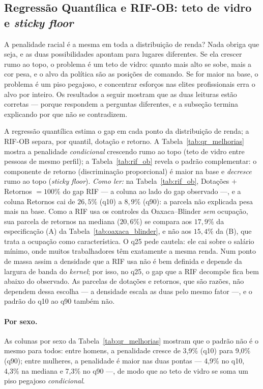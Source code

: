 \documentclass[12pt, a4paper, oneside]{article}
\let\oldsubsectionFB\subsection
\renewcommand{\subsection}{\FloatBarrier\oldsubsectionFB}
\begin{document}
\subsection{Regressão Quantílica e RIF-OB: teto de vidro e \emph{sticky floor}}
\label{subsec:qr_rif}
A penalidade racial é a mesma em toda a distribuição de renda? Nada obriga que seja,
e as duas possibilidades apontam para lugares diferentes. Se ela crescer rumo ao topo, o
problema é um teto de vidro: quanto mais alto se sobe, mais a cor pesa, e o alvo da
política são as posições de comando. Se for maior na base, o problema é um piso
pegajoso, e concentrar esforços nas elites profissionais erra o alvo por inteiro. Os
resultados a seguir mostram que as duas leituras estão corretas --- porque respondem a
perguntas diferentes, e a subseção termina explicando por que não se contradizem.

A regressão quantílica estima o gap em cada ponto da distribuição de renda; a
RIF-OB separa, por quantil, dotação e retorno. A Tabela~\ref{tab:qr_melhorias}
mostra a penalidade \emph{condicional} crescendo rumo ao topo (teto de vidro entre
pessoas de mesmo perfil); a
Tabela~\ref{tab:rif_ob} revela o padrão complementar: o componente de retorno
(discriminação proporcional) é maior na base e \emph{decresce} rumo ao topo
(\emph{sticky floor}). \emph{Como ler:} na Tabela~\ref{tab:rif_ob}, Dotações $+$
Retornos $=100\%$ do gap RIF --- a coluna ao lado do gap observado ---,
e a coluna Retornos cai de $26{,}5\%$ (q10) a $8{,}9\%$ (q90):
a parcela não explicada pesa mais na base. Como a RIF usa os controles da
Oaxaca--Blinder \emph{sem} ocupação, sua parcela de retornos na mediana
($20{,}6\%$) se compara aos $17{,}9\%$ da especificação (A)
da Tabela~\ref{tab:oaxaca_blinder}, e não aos $15{,}4\%$ da (B), que trata a
ocupação como característica. O q25 pede cautela: ele cai sobre o salário mínimo,
onde muitos trabalhadores têm exatamente a mesma renda. Num ponto de massa assim a
densidade que a RIF usa não é bem definida e depende da largura de banda do
\emph{kernel}; por isso, no q25, o gap que a RIF decompõe fica bem abaixo do
observado. As parcelas de dotações e retornos, que são razões, não dependem dessa
escolha --- a densidade escala as duas pelo mesmo fator ---, e o padrão do q10 ao q90
também não.

\paragraph{Por sexo.} As colunas por sexo da Tabela~\ref{tab:qr_melhorias} mostram que o padrão não é o mesmo para todos: entre homens, a penalidade cresce de 3,9\% (q10) para 9,0\% (q90); entre mulheres, a penalidade é maior nas duas pontas --- 4,9\% no q10, 4,3\% na mediana e 7,3\% no q90 ---, de modo que ao teto de vidro se soma um piso pegajoso \emph{condicional}.
\end{document}
